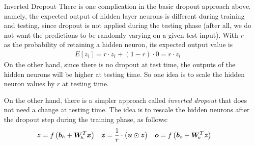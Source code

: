\begin{frame}{Inverted Dropout}
There is one complication in the basic dropout approach above, namely,
the expected output of hidden layer neurons is different during training
and testing, since dropout is not applied during the testing phase 
(after all, we do not want the predictions to be randomly varying on a
given test input). With $r$ as the probability of retaining a
hidden neuron, its expected output value is
\begin{align*}
    E[z_i] = r \cdot z_i + (1-r) \cdot 0 = r \cdot z_i
\end{align*}
On the other hand, since there is no dropout at test time, the outputs
of the hidden neurons will be higher at testing time. So one idea is to
scale the hidden neuron values by $r$ at testing time. 

	\medskip

	On the other
hand, there is a simpler approach called {\em inverted dropout} that
does not need a change at testing time. The idea is to rescale the
hidden neurons after the dropout step during the training phase, as follows:
\begin{align*}
	{\boldsymbol z} & = f\left({\boldsymbol b}_{h} + {\boldsymbol W}_{\!h}^T {\boldsymbol x} \right) &
	\tilde{{\boldsymbol z}} & = \frac{1}{r} \cdot \bigl({\boldsymbol u} \odot {\boldsymbol z}\bigr) &
    {\boldsymbol o} & = f\left({\boldsymbol b}_{o} + {\boldsymbol W}_{\!o}^T \tilde{{\boldsymbol z}} \right)
\end{align*}
\end{frame}
%
